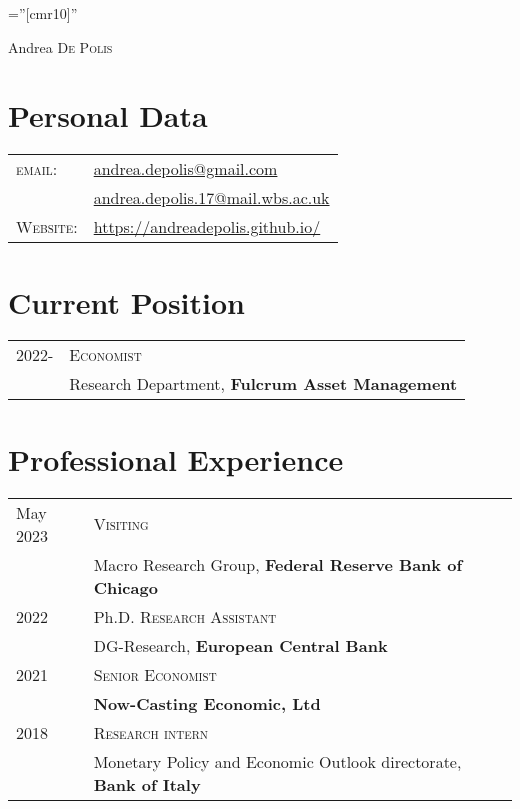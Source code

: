 \documentclass[a4paper,12pt]{article}
\begin{document}
\font\fb=''[cmr10]''

\par{\centering
		{\Huge Andrea \textsc{De Polis}
	}\par}

\section{Personal Data}
\renewcommand{\arraystretch}{0.75}
\begin{tabular}{ll}
    \textsc{email:}     & \href{mailto:andrea.depolis@gmail.com}{andrea.depolis@gmail.com}\\
                        & \href{mailto:andrea.depolis.17@mail.wbs.ac.uk}{andrea.depolis.17@mail.wbs.ac.uk} \\
    \textsc{Website:}   & \url{https://andreadepolis.github.io/}            
                        
\end{tabular}
\section{Current Position}
\begin{tabular}{ll}
2022- & \textsc{Economist}\\
& Research Department, \textbf{Fulcrum Asset Management}
\end{tabular}

\section{Professional Experience}
\begin{tabular}{ll}
May 2023 & \textsc{Visiting}\\
& Macro Research Group, \textbf{Federal Reserve Bank of Chicago}\\[1em]
2022 & Ph.D. \textsc{Research Assistant}\\
&DG-Research, \textbf{European Central Bank}\\[1em]
2021 & \textsc{Senior Economist}\\
&\textbf{Now-Casting Economic, Ltd}\\[1em]
2018 & \textsc{Research intern} \\
&Monetary Policy and Economic Outlook directorate, \textbf{Bank of Italy}
\end{tabular}
\end{document}
